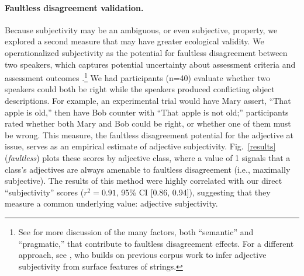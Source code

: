 \documentclass[manuscript]{stjour}
\begin{document}
\paragraph{Faultless disagreement validation.} Because subjectivity may be an ambiguous, or even subjective, property, we explored a second measure that may have greater ecological validity. 
We operationalized subjectivity as the potential for faultless disagreement between two speakers, which captures potential uncertainty about assessment criteria and assessment outcomes \citep{Kolbel2004,kennedy2013,barker2013}.\footnote{See \cite{MacFarlane2014} for more discussion of the many factors, both ``semantic'' and ``pragmatic,'' that contribute to faultless disagreement effects. For a different approach, see \cite{hill2012}, who builds on previous corpus work \citep{wulff2003} to infer adjective subjectivity from surface features of strings.}
We had participants (n=40) evaluate whether two speakers could both be right while the speakers produced conflicting object descriptions. For example, an experimental trial would have Mary assert, ``That apple is old,'' then have Bob counter with ``That apple is not old;'' 
participants rated whether both Mary and Bob could be right, or whether one of them must be wrong. This measure, the faultless disagreement potential for the adjective at issue, serves as an empirical estimate of adjective subjectivity. 
Fig.\ \ref{results} (\emph{faultless}) plots these scores by adjective class, where a value of 1 signals that a class's adjectives are always amenable to faultless disagreement (i.e., maximally subjective). 
The results of this method were highly correlated with our direct ``subjectivity'' scores ($r^{2} = 0.91$, 95\% CI [0.86, 0.94]), suggesting that they measure a common underlying value: adjective subjectivity. 

\end{document}
